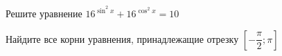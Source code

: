\begin{ex}
	\begin{condition}
		\begin{enumcols}[label=\asbuk*)]
			\item Решите уравнение \( 16^{\sin^2 x} + 16^{\cos^2 x} =10 \)
			\item Найдите все корни уравнения, принадлежащие отрезку \( \left[-\dfrac{\pi}{2};\pi\right] \)
		\end{enumcols}
	\end{condition}
\end{ex}